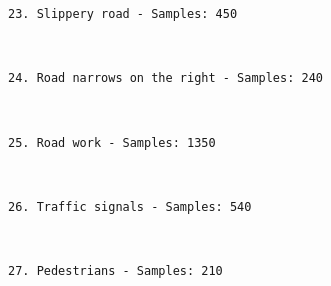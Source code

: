 \documentclass[11pt]{article}
\begin{document}
    \begin{Verbatim}[commandchars=\\\{\}]
23. Slippery road - Samples: 450

    \end{Verbatim}

    \begin{center}
    \end{center}
    { \hspace*{\fill} \\}
    
    \begin{Verbatim}[commandchars=\\\{\}]
24. Road narrows on the right - Samples: 240

    \end{Verbatim}

    \begin{center}
    \end{center}
    { \hspace*{\fill} \\}
    
    \begin{Verbatim}[commandchars=\\\{\}]
25. Road work - Samples: 1350

    \end{Verbatim}

    \begin{center}
    \end{center}
    { \hspace*{\fill} \\}
    
    \begin{Verbatim}[commandchars=\\\{\}]
26. Traffic signals - Samples: 540

    \end{Verbatim}

    \begin{center}
    \end{center}
    { \hspace*{\fill} \\}
    
    \begin{Verbatim}[commandchars=\\\{\}]
27. Pedestrians - Samples: 210

    \end{Verbatim}
\end{document}
